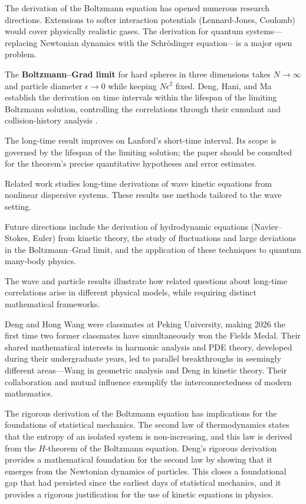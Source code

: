 The derivation of the Boltzmann equation has opened numerous research directions. Extensions to softer interaction potentials (Lennard-Jones, Coulomb) would cover physically realistic gases. The derivation for quantum systems---replacing Newtonian dynamics with the Schr\"{o}dinger equation---is a major open problem.

The \textbf{Boltzmann--Grad limit} for hard spheres in three dimensions takes $N\to\infty$ and particle diameter $\epsilon\to0$ while keeping $N\epsilon^2$ fixed. Deng, Hani, and Ma establish the derivation on time intervals within the lifespan of the limiting Boltzmann solution, controlling the correlations through their cumulant and collision-history analysis \cite{denghanima2024}.

The long-time result improves on Lanford's short-time interval. Its scope is governed by the lifespan of the limiting solution; the paper should be consulted for the theorem's precise quantitative hypotheses and error estimates.

Related work studies long-time derivations of wave kinetic equations from nonlinear dispersive systems. These results use methods tailored to the wave setting.

Future directions include the derivation of hydrodynamic equations (Navier--Stokes, Euler) from kinetic theory, the study of fluctuations and large deviations in the Boltzmann--Grad limit, and the application of these techniques to quantum many-body physics.

The wave and particle results illustrate how related questions about long-time correlations arise in different physical models, while requiring distinct mathematical frameworks.

Deng and Hong Wang were classmates at Peking University, making 2026 the first time two former classmates have simultaneously won the Fields Medal. Their shared mathematical interests in harmonic analysis and PDE theory, developed during their undergraduate years, led to parallel breakthroughs in seemingly different areas---Wang in geometric analysis and Deng in kinetic theory. Their collaboration and mutual influence exemplify the interconnectedness of modern mathematics.

The rigorous derivation of the Boltzmann equation has implications for the foundations of statistical mechanics. The second law of thermodynamics states that the entropy of an isolated system is non-increasing, and this law is derived from the $H$-theorem of the Boltzmann equation. Deng's rigorous derivation provides a mathematical foundation for the second law by showing that it emerges from the Newtonian dynamics of particles. This closes a foundational gap that had persisted since the earliest days of statistical mechanics, and it provides a rigorous justification for the use of kinetic equations in physics.

